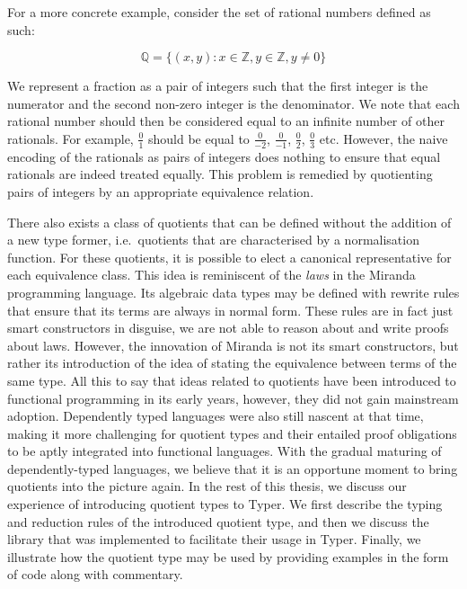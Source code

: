 \documentclass[12pt,twoside,maitrise]{dms}
\theoremstyle{definition}
\numberwithin{equation}{section}
\numberwithin{table}{chapter}
\numberwithin{figure}{chapter}
\begin{document}
For a more concrete example, consider the set of rational numbers defined as
such:

\begin{equation}
\mathbb{Q} = \{(x,y) : x \in \mathbb{Z}, y \in \mathbb{Z}, y \ne 0\}
\end{equation}

We represent a fraction as a pair of integers such that the first integer is the
numerator and the second non-zero integer is the denominator. We note that each
rational number should then be considered equal to an infinite number of other
rationals. For example, $\frac{0}{1}$ should be equal to $\frac{0}{-2}$,
$\frac{0}{-1}$, $\frac{0}{2}$, $\frac{0}{3}$ etc. However, the naive encoding of
the rationals as pairs of integers does nothing to ensure that equal rationals
are indeed treated equally. This problem is remedied by quotienting pairs of
integers by an appropriate equivalence relation.


There also exists a class of quotients that can be defined without the addition
of a new type former, i.e.\ quotients that are characterised by a normalisation
function\cite{li2015quotient,courtieu-normalizedtypes}. For these quotients, it
is possible to elect a canonical representative for each equivalence class. This
idea is reminiscent of the \emph{laws} in the Miranda programming
language\cite{thompson1986laws}. Its algebraic data types may be defined with
rewrite rules that ensure that its terms are always in normal form. These rules
are in fact just smart constructors in disguise, we are not able to reason about
and write proofs about laws. However, the innovation of Miranda is not its smart
constructors, but rather its introduction of the idea of stating the equivalence
between terms of the same type. All this to say that ideas related to quotients
have been introduced to functional programming in its early years, however, they
did not gain mainstream adoption. Dependently typed languages were also still
nascent at that time, making it more challenging for quotient types and their
entailed proof obligations to be aptly integrated into functional languages.
With the gradual maturing of dependently-typed languages, we believe that it is
an opportune moment to bring quotients into the picture again. In the rest of
this thesis, we discuss our experience of introducing quotient types to Typer.
We first describe the typing and reduction rules of the introduced quotient
type, and then we discuss the library that was implemented to facilitate their
usage in Typer. Finally, we illustrate how the quotient type may be used by
providing examples in the form of code along with commentary.
\end{document}

